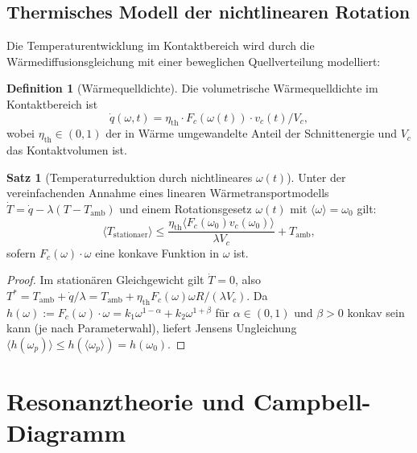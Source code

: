 ﻿\documentclass[a4paper,12pt]{article}
\theoremstyle{definition}
\newtheorem{definition}{Definition}
\newtheorem{satz}{Satz}
\begin{document}
\subsection{Thermisches Modell der nichtlinearen Rotation}
\label{sec:thermisch}

Die Temperaturentwicklung im Kontaktbereich wird durch die Wärmediffusionsgleichung
mit einer beweglichen Quellverteilung modelliert:

\begin{definition}[Wärmequelldichte]
Die volumetrische Wärmequelldichte im Kontaktbereich ist
\begin{equation}
\label{eq:waermequelle}
\dot{q}(\omega, t) = \eta_{\mathrm{th}} \cdot F_c(\omega(t)) \cdot v_c(t) / V_c,
\end{equation}
wobei $\eta_{\mathrm{th}} \in (0,1)$ der in Wärme umgewandelte Anteil der Schnittenergie
und $V_c$ das Kontaktvolumen ist.
\end{definition}

\begin{satz}[Temperaturreduktion durch nichtlineares $\omega(t)$]
\label{satz:temperatur}
Unter der vereinfachenden Annahme eines linearen Wärmetransportmodells
$\dot{T} = \dot{q} - \lambda(T - T_{\mathrm{amb}})$
und einem Rotationsgesetz $\omega(t)$ mit $\langle\omega\rangle = \omega_0$ gilt:
\[
\langle T_{\mathrm{stationaer}} \rangle \leq \frac{\eta_{\mathrm{th}} \langle F_c(\omega_0) v_c(\omega_0)\rangle}{\lambda V_c} + T_{\mathrm{amb}},
\]
sofern $F_c(\omega)\cdot\omega$ eine konkave Funktion in $\omega$ ist.
\end{satz}

\begin{proof}
Im stationären Gleichgewicht gilt $\dot{T} = 0$, also
$T^* = T_{\mathrm{amb}} + \dot{q}/\lambda = T_{\mathrm{amb}} + \eta_{\mathrm{th}} F_c(\omega) \omega R / (\lambda V_c)$.
Da $h(\omega) := F_c(\omega)\cdot\omega = k_1\omega^{1-\alpha} + k_2\omega^{1+\beta}$ für $\alpha \in (0,1)$
und $\beta > 0$ konkav sein kann (je nach Parameterwahl), liefert Jensens Ungleichung
$\langle h(\omega_p)\rangle \leq h(\langle\omega_p\rangle) = h(\omega_0)$.
\end{proof}

\section{Resonanztheorie und Campbell-Diagramm}
\label{sec:resonanz}
\end{document}
